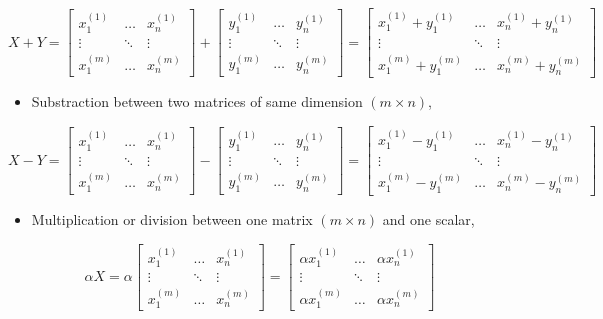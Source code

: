 \documentclass{42-en}
\begin{document}
$$
X + Y = 
\begin{bmatrix}
  x_{1}^{(1)} & \dots & x_{n}^{(1)} \\
  \vdots & \ddots & \vdots \\ 
  x_{1}^{(m)} & \dots & x_{n}^{(m)} 
\end{bmatrix} +  
\begin{bmatrix}
  y_{1}^{(1)} & \dots & y_{n}^{(1)}  \\
  \vdots & \ddots & \vdots \\
  y_{1}^{(m)} & \dots & y_{n}^{(m)} 
\end{bmatrix} = 
\begin{bmatrix}
  x_{1}^{(1)} + y_{1}^{(1)}  & \dots & x_{n}^{(1)} + y_{n}^{(1)}  \\
  \vdots & \ddots & \vdots \\
  x_{1}^{(m)} + y_{1}^{(m)} & \dots & x_{n}^{(m)} + y_{n}^{(m)}
\end{bmatrix}
$$

\begin{itemize}
  \item Substraction between two matrices of same dimension $(m \times n)$,
\end{itemize}

$$
X - Y = 
\begin{bmatrix} 
x_{1}^{(1)} & \dots & x_{n}^{(1)}  \\ 
\vdots & \ddots & \vdots \\ 
x_{1}^{(m)} & \dots & x_{n}^{(m)} 
\end{bmatrix} - 
\begin{bmatrix} 
y_{1}^{(1)} & \dots & y_{n}^{(1)}  \\ 
\vdots & \ddots & \vdots \\ 
y_{1}^{(m)} & \dots & y_{n}^{(m)} 
\end{bmatrix} = 
\begin{bmatrix} 
x_{1}^{(1)} - y_{1}^{(1)}  & \dots & x_{n}^{(1)} - y_{n}^{(1)}  \\ 
\vdots & \ddots & \vdots \\ 
x_{1}^{(m)} - y_{1}^{(m)} & \dots & x_{n}^{(m)} - y_{n}^{(m)}
\end{bmatrix}
$$

\begin{itemize}
  \item Multiplication or division between one matrix $(m \times n)$ and one scalar,
\end{itemize}

$$
\alpha X = 
\alpha \begin{bmatrix} 
x_{1}^{(1)} & \dots & x_{n}^{(1)}  \\ 
\vdots & \ddots & \vdots \\ 
x_{1}^{(m)} & \dots & x_{n}^{(m)} 
\end{bmatrix} 
= 
\begin{bmatrix} 
\alpha x_{1}^{(1)}  & \dots & \alpha x_{n}^{(1)}  \\ 
\vdots & \ddots & \vdots \\ 
\alpha x_{1}^{(m)} & \dots & \alpha x_{n}^{(m)}
\end{bmatrix}
$$
\end{document}

